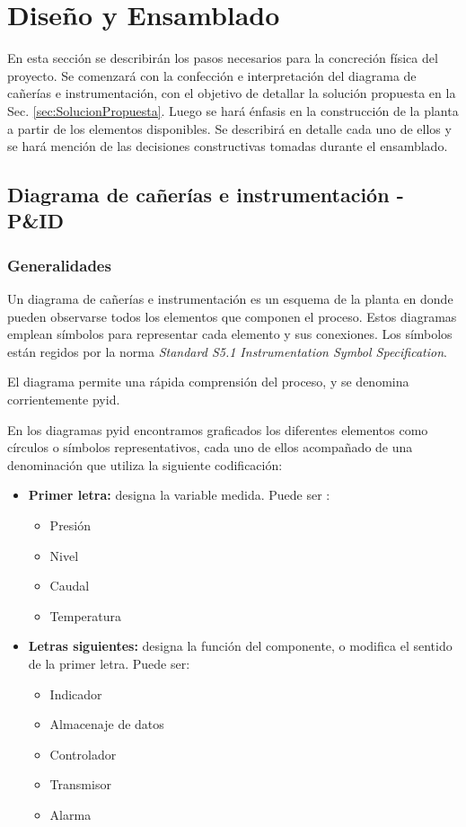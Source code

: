 \chapter{Diseño y Ensamblado}
\label{ch:DisenoEnsamblado}

En esta sección se describirán los pasos necesarios para la concreción física
del proyecto.
Se comenzará con la confección e interpretación del diagrama de cañerías e
instrumentación, con el objetivo de detallar la solución propuesta en
la Sec. \ref{sec:SolucionPropuesta}.
Luego se hará énfasis en la construcción de la planta a partir de los elementos
disponibles.
Se describirá en detalle cada uno de ellos y se hará mención de
las decisiones constructivas tomadas durante el ensamblado.

\section{Diagrama de cañerías e instrumentación - P\&ID}
\label{sec:p&id}

\subsection{Generalidades}
Un diagrama de cañerías e instrumentación es un esquema de la planta en donde
pueden observarse todos los elementos que componen el proceso.
Estos diagramas emplean símbolos para representar cada elemento y sus
conexiones.
Los símbolos están regidos por la norma
\emph{Standard S5.1 Instrumentation Symbol Specification}.

El diagrama permite una rápida comprensión del proceso, y se denomina
corrientemente \gls{pyid}.

En los diagramas \gls{pyid} encontramos graficados los diferentes elementos
como círculos o símbolos representativos, cada uno de ellos acompañado de una
denominación que utiliza la siguiente codificación:

\begin{itemize}  
 \item \textbf{Primer letra:}
 designa la variable medida. Puede ser :
 \begin{itemize}
  \item Presión
  \item Nivel
  \item Caudal
  \item Temperatura
 \end{itemize}

 \item \textbf{Letras siguientes:}
 designa la función del componente, o modifica el sentido de la primer letra.
 Puede ser:
 \begin{itemize}
  \item Indicador
  \item Almacenaje de datos
  \item Controlador
  \item Transmisor
  \item Alarma
 \end{itemize}
\end{itemize}


